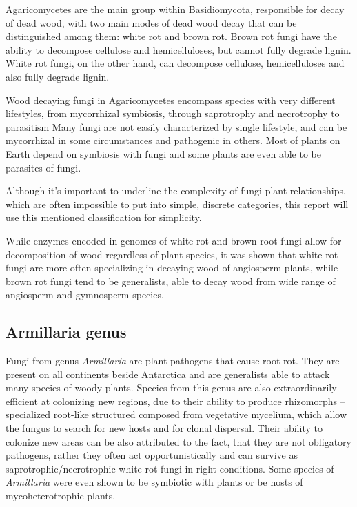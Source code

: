 \documentclass[two column, twoside, a4paper]{article}
\begin{document}
Agaricomycetes are the main group within Basidiomycota, responsible for decay of dead wood\autocite{Krah2018}, with two main modes of dead wood decay that can be distinguished among them: white rot and brown rot. Brown rot fungi have the ability to decompose cellulose and hemicelluloses, but cannot fully degrade lignin. White rot fungi, on the other hand, can decompose cellulose, hemicelluloses and also fully degrade lignin.\autocite{Worrall1997}

  Wood decaying fungi in Agaricomycetes encompass species with very different lifestyles, from mycorrhizal symbiosis, through saprotrophy and necrotrophy to parasitism\autocite{Krah2018} Many fungi are not easily characterized by single lifestyle, and can be mycorrhizal in some circumstances and pathogenic in others. Most of plants on Earth depend on symbiosis with fungi\autocite{Brundrett2018} and some plants are even able to be parasites of fungi\autocite{Leake1994, Bidartondo2002, Merckx2009}. 

  Although it's important to underline the complexity of fungi-plant relationships, which are often impossible to put into simple, discrete categories, this report will use this mentioned classification for simplicity.

  While enzymes encoded in genomes of white rot and brown root fungi allow for decomposition of wood regardless of plant species, it was shown that white rot fungi are more often specializing in decaying wood of angiosperm plants, while brown rot fungi tend to be generalists, able to decay wood from wide range of angiosperm and gymnosperm species.\autocite{Krah2018}

\subsection{Armillaria genus}

Fungi from genus \textit{Armillaria} are plant pathogens that cause root rot. They are present on all continents beside Antarctica\autocite{Coetzee2018} and are generalists able to attack many species of woody plants. Species from this genus are also extraordinarily efficient at colonizing new regions, due to their ability to produce rhizomorphs -- specialized root-like structured composed from vegetative mycelium, which allow the fungus to search for new hosts and for clonal dispersal. Their ability to colonize new areas can be also attributed to the fact, that they are not obligatory pathogens, rather they often act opportunistically and can survive as saprotrophic/necrotrophic white rot fungi in right conditions\autocite{Gregory1985, Morrison2004, Baumgartner2011}. Some species of \textit{Armillaria} were even shown to be symbiotic with plants or be hosts of mycoheterotrophic plants\autocite{Zhan2020, Liu2023}.
\end{document}
